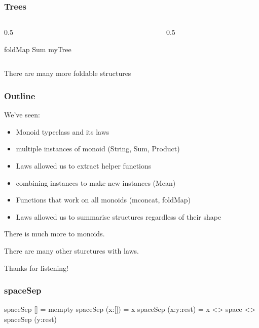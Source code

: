 \documentclass[UKenglish,usenames,dvipsnames,svgnames,table,aspectratio=169,mathserif]{beamer}
\newcommand{\textslide}[1]{{
\begin{frame}
\begin{center}

#1

\end{center}
\end{frame}
}}
\begin{document}
\begin{frame}[fragile]
\frametitle{Trees}
\begin{columns}
\begin{column}{0.5\textwidth}
\begin{haskellcode}
foldMap Sum myTree
\end{haskellcode}
\end{column}
\begin{column}{0.5\textwidth}

\end{column}
\end{columns}
\end{frame}


\textslide{There are many more foldable structures}


\begin{frame}
\frametitle{Outline}
\begin{center}
\begin{minipage}{0.6\textwidth}
We've seen:

\begin{itemize}
\item Monoid typeclass and its laws
\item multiple instances of monoid (String, Sum, Product)
\item Laws allowed us to extract helper functions
\item combining instances to make new instances (Mean)
\item Functions that work on all monoids (mconcat, foldMap)
\item Laws allowed us to summarise structures regardless of their shape
\end{itemize}
\end{minipage}
\end{center}
\end{frame}


\textslide{
There is much more to monoids.
\medskip

There are many other sturctures with laws.
}

\textslide{\Large{Thanks for listening!}}


\begin{frame}[fragile]
\frametitle{spaceSep}
\begin{center}
\begin{minipage}{0.6\textwidth}
\begin{haskellcode}
spaceSep [] = mempty
spaceSep (x:[]) = x
spaceSep (x:y:rest) = x <> space <> spaceSep (y:rest)
\end{haskellcode}
\end{minipage}
\end{center}
\end{frame}
\end{document}
